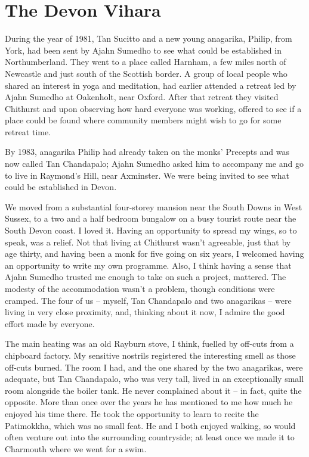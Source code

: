 \chapter{The Devon Vihara}

During the year of 1981, Tan Sucitto and a new young anagarika, Philip,
from York, had been sent by Ajahn Sumedho to see what could be
established in Northumberland. They went to a place called Harnham, a
few miles north of Newcastle and just south of the Scottish border. A
group of local people who shared an interest in yoga and meditation, had
earlier attended a retreat led by Ajahn Sumedho at Oakenholt, near
Oxford. After that retreat they visited Chithurst and upon observing how
hard everyone was working, offered to see if a place could be found
where community members might wish to go for some retreat time.

By 1983, anagarika Philip had already taken on the monks' Precepts and
was now called Tan Chandapalo; Ajahn Sumedho asked him to accompany me
and go to live in Raymond's Hill, near Axminster. We were being invited
to see what could be established in Devon.

We moved from a substantial four-storey mansion near the South Downs in
West Sussex, to a two and a half bedroom bungalow on a busy tourist
route near the South Devon coast. I loved it. Having an opportunity to
spread my wings, so to speak, was a relief. Not that living at Chithurst
wasn't agreeable, just that by age thirty, and having been a monk for
five going on six years, I welcomed having an opportunity to write my
own programme. Also, I think having a sense that Ajahn Sumedho trusted
me enough to take on such a project, mattered. The modesty of the
accommodation wasn't a problem, though conditions were cramped. The four
of us -- myself, Tan Chandapalo and two anagarikas -- were living in
very close proximity, and, thinking about it now, I admire the good
effort made by everyone.

The main heating was an old Rayburn stove, I think, fuelled by off-cuts
from a chipboard factory. My sensitive nostrils registered the
interesting smell as those off-cuts burned. The room I had, and the one
shared by the two anagarikas, were adequate, but Tan Chandapalo, who was
very tall, lived in an exceptionally small room alongside the boiler
tank. He never complained about it -- in fact, quite the opposite. More
than once over the years he has mentioned to me how much he enjoyed his
time there. He took the opportunity to learn to recite the Patimokkha,
which was no small feat. He and I both enjoyed walking, so would often
venture out into the surrounding countryside; at least once we made it
to Charmouth where we went for a swim.

